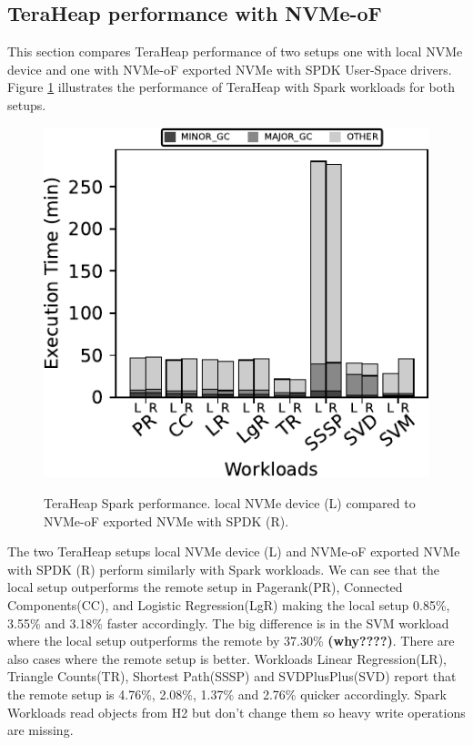 \subsection{TeraHeap performance with NVMe-oF}
\par This section compares TeraHeap performance of two setups one with local NVMe device and one with NVMe-oF exported NVMe with SPDK User-Space drivers. Figure \ref{fig:bench_spark} illustrates the performance of TeraHeap with Spark workloads for both setups. 
\begin{figure}[H]
  \includegraphics[width=\linewidth]{figures/bench_spark.pdf}\\
\caption{TeraHeap Spark performance. local NVMe device (L) compared to NVMe-oF exported NVMe with SPDK (R).}
\label{fig:bench_spark}
\end{figure}
The two TeraHeap setups local NVMe device (L) and NVMe-oF exported NVMe with SPDK (R) perform similarly with Spark workloads. We can see that the local setup outperforms the remote setup in Pagerank(PR), Connected Components(CC), and Logistic Regression(LgR) making the local setup 0.85\%, 3.55\% and 3.18\% faster accordingly. The big difference is in the SVM workload where the local setup outperforms the remote by 37.30\% \textbf{(why????)}. There are also cases where the remote setup is better. Workloads Linear Regression(LR), Triangle Counts(TR), Shortest Path(SSSP) and SVDPlusPlus(SVD) report that the remote setup is 4.76\%, 2.08\%, 1.37\% and 2.76\% quicker accordingly. Spark Workloads read objects from H2 but don't change them so heavy write operations are missing.

